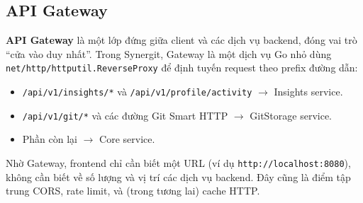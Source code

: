 \subsection{API Gateway}
\textbf{API Gateway} là một lớp đứng giữa client và các dịch vụ backend, đóng vai trò ``cửa vào duy nhất''. Trong Synergit, Gateway là một dịch vụ Go nhỏ dùng \texttt{net/http/httputil.ReverseProxy} để định tuyến request theo prefix đường dẫn:

\begin{itemize}
\item \texttt{/api/v1/insights/*} và \texttt{/api/v1/profile/activity} $\rightarrow$ Insights service.
\item \texttt{/api/v1/git/*} và các đường Git Smart HTTP $\rightarrow$ GitStorage service.
\item Phần còn lại $\rightarrow$ Core service.
\end{itemize}

Nhờ Gateway, frontend chỉ cần biết một URL (ví dụ \texttt{http://localhost:8080}), không cần biết về số lượng và vị trí các dịch vụ backend. Đây cũng là điểm tập trung CORS, rate limit, và (trong tương lai) cache HTTP.

